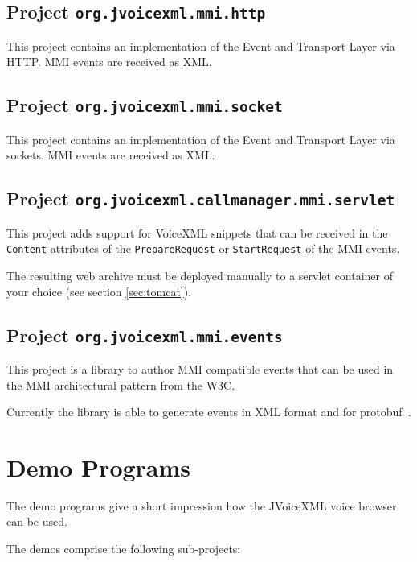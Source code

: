 \documentclass[11pt,a4paper]{article}
\begin{document}
\subsection{Project \texttt{org.jvoicexml.mmi.http}}

This project contains an implementation of the Event and Transport Layer
via HTTP. MMI events are received as XML.


\subsection{Project \texttt{org.jvoicexml.mmi.socket}}

This project contains an implementation of the Event and Transport Layer
via sockets. MMI events are received as XML.


\subsection{Project \texttt{org.jvoicexml.callmanager.mmi.servlet}}
\label{sec:mmi-servlet}

This project adds support for VoiceXML snippets that can be received
in the \lstinline{Content} attributes of the \lstinline{PrepareRequest}
or \lstinline{StartRequest} of the MMI events.

The resulting web archive must be deployed manually to a servlet container
of your choice (see section \ref{sec:tomcat}).


\subsection{Project \texttt{org.jvoicexml.mmi.events}}
\label{sec:mmi-events}

This project is a library to author MMI compatible events that can be used in
the MMI architectural pattern from the W3C.

Currently the library is able to generate events in XML format and for
protobuf~\cite{google:protobuf}. 

\section{Demo Programs}

The demo programs give a short impression how the JVoiceXML voice browser can
be used.

The demos comprise the following sub-projects:
\end{document}
